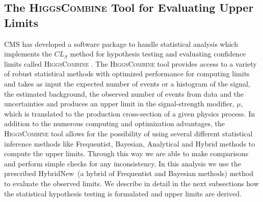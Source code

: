\subsection{The \textsc{HiggsCombine} Tool for Evaluating Upper Limits}
CMS has developed a software package to handle statistical analysis which implements the $CL_{S}$ method for hypothesis testing and evaluating confidence limits called \textsc{HiggsCombine} \cite{LIMITS}. The  \textsc{HiggsCombine} tool provides access to a variety of robust statistical methods with optimized performance for computing limits and takes as input the expected number of events or a histogram of the signal, the estimated background, the observed number of events from data and the uncertainties and produces an upper limit in the signal-strength modifier, $\mu$, which is translated to the production cross-section of a given physics process. In addition to the numerous computing and optimization advantages, the \textsc{HiggsCombine} tool allows for the possibility of using several different statistical inference methods like Frequentist, Bayesian, Analytical and Hybrid methods to compute the upper limits. Through this way we  are able to make comparisons and perform simple checks for any inconsistency. In this analysis we use the prescribed HybridNew~(a hybrid of Frequentist and Bayesian methods) method to evaluate the observed  limits. We describe in detail in the next subsections how the statistical hypothesis testing is formulated and upper limits are derived.

